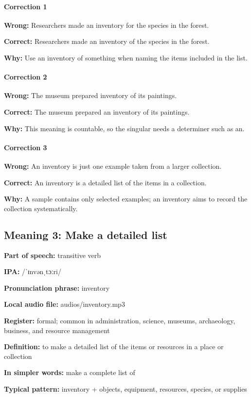 \documentclass[11pt]{article}
\begin{document}
\paragraph{Correction 1}
\textbf{Wrong:} Researchers made an inventory for the species in the forest.

\textbf{Correct:} Researchers made an inventory of the species in the forest.

\textbf{Why:} Use an inventory of something when naming the items included in the list.

\paragraph{Correction 2}
\textbf{Wrong:} The museum prepared inventory of its paintings.

\textbf{Correct:} The museum prepared an inventory of its paintings.

\textbf{Why:} This meaning is countable, so the singular needs a determiner such as an.

\paragraph{Correction 3}
\textbf{Wrong:} An inventory is just one example taken from a larger collection.

\textbf{Correct:} An inventory is a detailed list of the items in a collection.

\textbf{Why:} A sample contains only selected examples; an inventory aims to record the collection systematically.

\subsection{Meaning 3: Make a detailed list}
\textbf{Part of speech:} transitive verb

\textbf{IPA:} /ˈɪnvənˌtɔːri/

\textbf{Pronunciation phrase:} inventory

\textbf{Local audio file:} audios/inventory.mp3

\textbf{Register:} formal; common in administration, science, museums, archaeology, business, and resource management

\textbf{Definition:} to make a detailed list of the items or resources in a place or collection

\textbf{In simpler words:} make a complete list of

\textbf{Typical pattern:} inventory + objects, equipment, resources, species, or supplies
\end{document}
